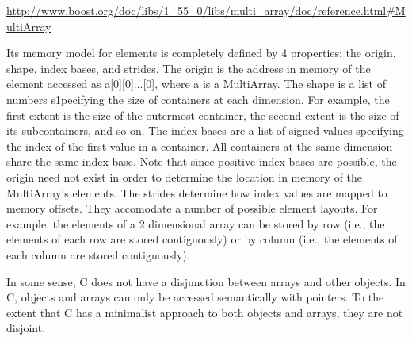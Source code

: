 \documentclass[preprint]{sigplanconf}
\begin{document}
\url{http://www.boost.org/doc/libs/1_55_0/libs/multi_array/doc/reference.html#MultiArray}

Its memory model for elements is completely defined by 4 properties: the origin, shape, index bases, and strides. The origin is the address in memory of the element accessed as a[0][0]...[0], where a is a MultiArray. The shape is a list of numbers s1pecifying the size of containers at each dimension. For example, the first extent is the size of the outermost container, the second extent is the size of its subcontainers, and so on. The index bases are a list of signed values specifying the index of the first value in a container. All containers at the same dimension share the same index base. Note that since positive index bases are possible, the origin need not exist in order to determine the location in memory of the MultiArray's elements. The strides determine how index values are mapped to memory offsets. They accomodate a number of possible element layouts. For example, the elements of a 2 dimensional array can be stored by row (i.e., the elements of each row are stored contiguously) or by column (i.e., the elements of each column are stored contiguously).


In some sense, C does not have a disjunction between arrays and other objects. In C, objects and arrays can only be accessed semantically with pointers. To the extent that C has a minimalist approach to both objects and arrays, they are not disjoint.
\end{document}
